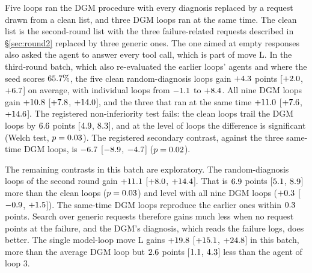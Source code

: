 Five loops ran the DGM procedure with every diagnosis replaced by a request drawn from a clean list, and three DGM loops
ran at the same time. The clean list is the second-round list with the three failure-related requests described in
\S\ref{sec:round2} replaced by three generic ones. The one aimed at empty responses also
asked the agent to answer every tool call, which is part of move L. In the third-round batch, which also re-evaluated the earlier loops' agents and where the seed scores $65.7\%$, the five clean
random-diagnosis loops
gain $+4.3$ points [$+2.0$, $+6.7$] on average, with individual loops from $-1.1$ to
$+8.4$. All nine DGM loops gain $+10.8$ [$+7.8$, $+14.0$], and the three that ran at the same
time $+11.0$ [$+7.6$, $+14.6$]. The registered non-inferiority test fails: the clean loops trail the DGM loops
by $6.6$ points [$4.9$, $8.3$], and at the level of loops the difference is
significant (Welch test, $p=0.03$). The registered secondary contrast, against the three same-time DGM loops,
is $-6.7$ [$-8.9$, $-4.7$] ($p=0.02$).

The remaining contrasts in this batch are exploratory. The random-diagnosis loops of the second round gain $+11.1$
[$+8.0$, $+14.4$]. That is
$6.9$ points [$5.1$, $8.9$] more than the clean loops ($p=0.03$) and level
with all nine DGM loops ($+0.3$ [$-0.9$, $+1.5$]). The same-time DGM loops reproduce the earlier
ones within $0.3$ points. Search over generic requests therefore gains much less when no request points at the
failure, and the DGM's diagnosis, which reads the failure logs, does better. The single model-loop move L gains $+19.8$
[$+15.1$, $+24.8$] in this batch, more than the average DGM loop but $2.6$ points [$1.1$,
$4.3$] less than the agent of loop 3.
